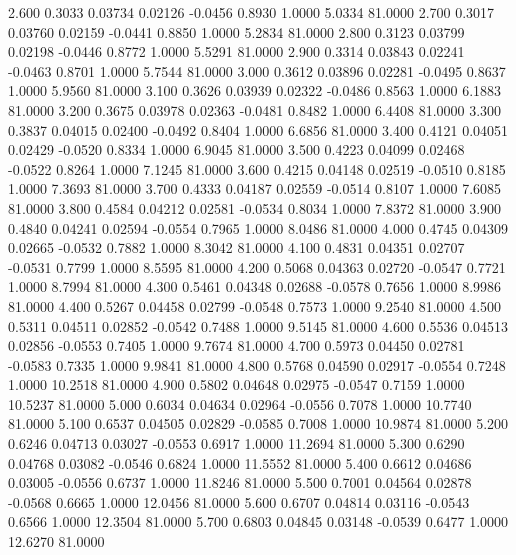   2.600   0.3033   0.03734   0.02126  -0.0456   0.8930   1.0000   5.0334  81.0000
   2.700   0.3017   0.03760   0.02159  -0.0441   0.8850   1.0000   5.2834  81.0000
   2.800   0.3123   0.03799   0.02198  -0.0446   0.8772   1.0000   5.5291  81.0000
   2.900   0.3314   0.03843   0.02241  -0.0463   0.8701   1.0000   5.7544  81.0000
   3.000   0.3612   0.03896   0.02281  -0.0495   0.8637   1.0000   5.9560  81.0000
   3.100   0.3626   0.03939   0.02322  -0.0486   0.8563   1.0000   6.1883  81.0000
   3.200   0.3675   0.03978   0.02363  -0.0481   0.8482   1.0000   6.4408  81.0000
   3.300   0.3837   0.04015   0.02400  -0.0492   0.8404   1.0000   6.6856  81.0000
   3.400   0.4121   0.04051   0.02429  -0.0520   0.8334   1.0000   6.9045  81.0000
   3.500   0.4223   0.04099   0.02468  -0.0522   0.8264   1.0000   7.1245  81.0000
   3.600   0.4215   0.04148   0.02519  -0.0510   0.8185   1.0000   7.3693  81.0000
   3.700   0.4333   0.04187   0.02559  -0.0514   0.8107   1.0000   7.6085  81.0000
   3.800   0.4584   0.04212   0.02581  -0.0534   0.8034   1.0000   7.8372  81.0000
   3.900   0.4840   0.04241   0.02594  -0.0554   0.7965   1.0000   8.0486  81.0000
   4.000   0.4745   0.04309   0.02665  -0.0532   0.7882   1.0000   8.3042  81.0000
   4.100   0.4831   0.04351   0.02707  -0.0531   0.7799   1.0000   8.5595  81.0000
   4.200   0.5068   0.04363   0.02720  -0.0547   0.7721   1.0000   8.7994  81.0000
   4.300   0.5461   0.04348   0.02688  -0.0578   0.7656   1.0000   8.9986  81.0000
   4.400   0.5267   0.04458   0.02799  -0.0548   0.7573   1.0000   9.2540  81.0000
   4.500   0.5311   0.04511   0.02852  -0.0542   0.7488   1.0000   9.5145  81.0000
   4.600   0.5536   0.04513   0.02856  -0.0553   0.7405   1.0000   9.7674  81.0000
   4.700   0.5973   0.04450   0.02781  -0.0583   0.7335   1.0000   9.9841  81.0000
   4.800   0.5768   0.04590   0.02917  -0.0554   0.7248   1.0000  10.2518  81.0000
   4.900   0.5802   0.04648   0.02975  -0.0547   0.7159   1.0000  10.5237  81.0000
   5.000   0.6034   0.04634   0.02964  -0.0556   0.7078   1.0000  10.7740  81.0000
   5.100   0.6537   0.04505   0.02829  -0.0585   0.7008   1.0000  10.9874  81.0000
   5.200   0.6246   0.04713   0.03027  -0.0553   0.6917   1.0000  11.2694  81.0000
   5.300   0.6290   0.04768   0.03082  -0.0546   0.6824   1.0000  11.5552  81.0000
   5.400   0.6612   0.04686   0.03005  -0.0556   0.6737   1.0000  11.8246  81.0000
   5.500   0.7001   0.04564   0.02878  -0.0568   0.6665   1.0000  12.0456  81.0000
   5.600   0.6707   0.04814   0.03116  -0.0543   0.6566   1.0000  12.3504  81.0000
   5.700   0.6803   0.04845   0.03148  -0.0539   0.6477   1.0000  12.6270  81.0000
